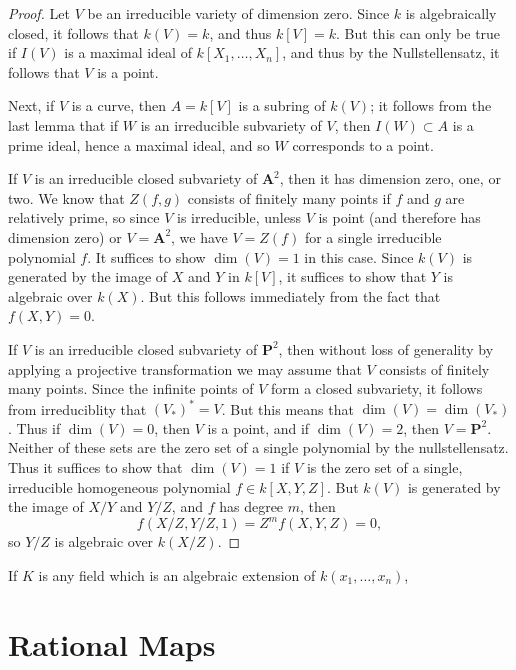 \begin{proof}
    Let $V$ be an irreducible variety of dimension zero. Since $k$ is algebraically closed, it follows that $k(V) = k$, and thus $k[V] = k$. But this can only be true if $I(V)$ is a maximal ideal of $k[X_1,\dots,X_n]$, and thus by the Nullstellensatz, it follows that $V$ is a point.

    Next, if $V$ is a curve, then $A = k[V]$ is a subring of $k(V)$; it follows from the last lemma that if $W$ is an irreducible subvariety of $V$, then $I(W) \subset A$ is a prime ideal, hence a maximal ideal, and so $W$ corresponds to a point.

    If $V$ is an irreducible closed subvariety of $\mathbf{A}^2$, then it has dimension zero, one, or two. We know that $Z(f,g)$ consists of finitely many points if $f$ and $g$ are relatively prime, so since $V$ is irreducible, unless $V$ is point (and therefore has dimension zero) or $V = \mathbf{A}^2$, we have $V = Z(f)$ for a single irreducible polynomial $f$. It suffices to show $\dim(V) = 1$ in this case. Since $k(V)$ is generated by the image of $X$ and $Y$ in $k[V]$, it suffices to show that $Y$ is algebraic over $k(X)$. But this follows immediately from the fact that $f(X,Y) = 0$.

    If $V$ is an irreducible closed subvariety of $\mathbf{P}^2$, then without loss of generality by applying a projective transformation we may assume that $V$ consists of finitely many points. Since the infinite points of $V$ form a closed subvariety, it follows from irreduciblity that $(V_*)^* = V$. But this means that $\dim(V) = \dim(V_*)$. Thus if $\dim(V) = 0$, then $V$ is a point, and if $\dim(V) = 2$, then $V = \mathbf{P}^2$. Neither of these sets are the zero set of a single polynomial by the nullstellensatz. Thus it suffices to show that $\dim(V) = 1$ if $V$ is the zero set of a single, irreducible homogeneous polynomial $f \in k[X,Y,Z]$. But $k(V)$ is generated by the image of $X/Y$ and $Y/Z$, and $f$ has degree $m$, then
    \[ f(X/Z,Y/Z,1) = Z^m f(X,Y,Z) = 0, \]
    so $Y/Z$ is algebraic over $k(X/Z)$.
\end{proof}

If $K$ is any field which is an algebraic extension of $k(x_1,\dots,x_n)$,

\section{Rational Maps}

